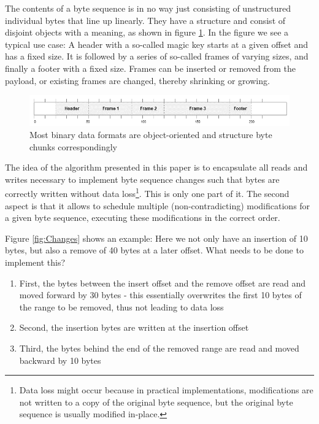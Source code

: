 \documentclass[english, 10pt, openright, twocolumn, landscape, twoside, notitlepage, a4paper, pdftex]		
{article}
\begin{document}
The contents of a byte sequence is in no way just consisting of unstructured individual bytes that line up linearly. They have a structure and consist of disjoint objects with a meaning, as shown in figure \ref{fig:Objects}. In the figure we see a typical use case: A header with a so-called magic key starts at a given offset and has a fixed size. It is followed by a series of so-called frames of varying sizes, and finally a footer with a fixed size. Frames can be inserted or removed from the payload, or existing frames are changed, thereby shrinking or growing.

\begin{figure}[htbp]
\centering
\includegraphics[width=1.00\columnwidth]{figures/Objects.png}
\caption{Most binary data formats are object-oriented and structure byte chunks correspondingly}
\label{fig:Objects}
\end{figure}

The idea of the algorithm presented in this paper is to encapsulate all reads and writes necessary to implement byte sequence changes such that bytes are correctly written without data loss\footnote{Data loss might occur because in practical implementations, modifications are not written to a copy of the original byte sequence, but the original byte sequence is usually modified in-place.}. This is only one part of it. The second aspect is that it allows to schedule multiple (non-contradicting) modifications for a given byte sequence, executing these modifications in the correct order.

Figure \ref{fig:Changes} shows an example: Here we not only have an insertion of 10 bytes, but also a remove of 40 bytes at a later offset. What needs to be done to implement this?
\begin{enumerate}
\item First, the bytes between the insert offset and the remove offset are read and moved forward by 30 bytes - this essentially overwrites the first 10 bytes of the range to be removed, thus not leading to data loss
\item Second, the insertion bytes are written at the insertion offset
\item Third, the bytes behind the end of the removed range are read and moved backward by 10 bytes
\end{enumerate}
\end{document}
